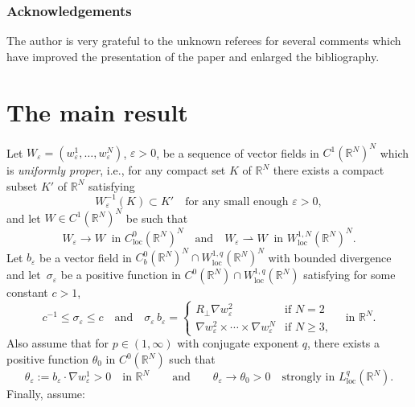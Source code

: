 \documentclass[11pt]{article}
\newcommand{\ie}{i.e.,\xspace}
\newcommand{\loc}{\mathrm{loc}}
\def \RR {\mathbb R}
\theoremstyle{plain}
\theoremstyle{definition}
\numberwithin{equation}{section}
\begin{document}
\subsubsection*{Acknowledgements} The author is very grateful to the unknown referees for several comments which have improved the presentation of the paper and enlarged the bibliography.

\section{The main result}\label{s.res}
Let $W_\varepsilon=(w_\varepsilon^1,\dots,w_\varepsilon^N)$, $\varepsilon>0$, be a sequence of vector fields in $C^1(\RR^N)^N$
which is {\em uniformly proper}, \ie for any compact set $K$ of $\RR^N$ there exists a compact subset $K'$ of $\RR^N$ satisfying\enlargethispage{-\baselineskip}%
\begin{equation}\label{upWe}
W_\varepsilon^{-1}(K)\subset K'\quad\mbox{for any small enough }\varepsilon>0,
\end{equation}
and let $W\in C^1(\RR^N)^N$ be such that
\begin{equation}\label{cWe}
W_\varepsilon\to W\;\;\mbox{in }C^0_\loc(\RR^N)^N\quad\mbox{and}\quad W_\varepsilon\rightharpoonup W\;\;\mbox{in }W^{1,N}_\loc(\RR^N)^N.
\end{equation}
Let $b_\varepsilon$ be a vector field in $C^0_b(\RR^N)^N\cap W^{1,q}_\loc(\RR^N)^N$ with bounded divergence and let~$\sigma_\varepsilon$ be a positive function in $C^0(\RR^N)\cap W^{1,q}_\loc(\RR^N)$ satisfying for some constant $c>1$,
\begin{equation}\label{siebe}
c^{-1}\leq\sigma_\varepsilon\leq c\quad\mbox{and}\quad
\sigma_\varepsilon\,b_\varepsilon=\begin{cases}
R_\perp\nabla w_\varepsilon^2 & \mbox{if }N=2
\\[3pt]
\nabla w_\varepsilon^2\times\cdots\times \nabla w_\varepsilon^N & \mbox{if }N\geq 3,
\end{cases}
\quad \mbox{in }\RR^N.
\end{equation}
Also assume that for $p\in(1,\infty)$ with conjugate exponent $q$, there exists a positive function $\theta_0$ in $C^0(\RR^N)$ such that
\begin{equation}\label{cthe}
\theta_\varepsilon:=b_\varepsilon\cdot\nabla w_\varepsilon^1>0\quad\mbox{in }\RR^N \qquad\mbox{and}\qquad \theta_\varepsilon\to\theta_0>0\quad\mbox{strongly in }L^q_\loc(\RR^N).
\end{equation}
\pagebreak[2]%
Finally, assume:
\end{document}
